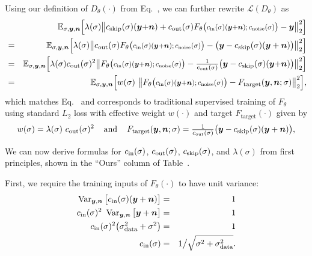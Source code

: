 Using our definition of $D_\theta(\cdot)$ from Eq.~, we can further rewrite $\mathcal{L}(D_\theta)$ as
\begin{eqnarray}
  && \mathbb{E}_{\sigma, \signal, \noise} \Big[ \lambda(\sigma) \big\lVert \cskip(\sigma) (\signal {+} \noise) + \cout(\sigma) F_\theta\big(\Fargs\big) - \signal \big\rVert^2_2 \Big] \label{eq:lossexpanded} \\
  &=& \mathbb{E}_{\sigma, \signal, \noise} \Big[ \lambda(\sigma) \big\lVert \cout(\sigma) F_\theta\big(\Fargs\big) - \big( \signal - \cskip(\sigma) (\signal + \noise) \big) \big\rVert^2_2 \Big] \\
  &=& \mathbb{E}_{\sigma, \signal, \noise} \Big[ \lambda(\sigma) \cout(\sigma)^2 \big\lVert F_\theta\big(\Fargs\big) - \tfrac{1}{\cout(\sigma)} \big( \signal - \cskip(\sigma) (\signal {+} \noise) \big) \big\rVert^2_2 \Big] \\
  &=& \mathbb{E}_{\sigma, \signal, \noise} \Big[ w(\sigma) ~\big\lVert F_\theta\big(\Fargs\big) - F_\text{target}(\signal, \noise; \sigma) \big\rVert^2_2 \Big]
  \text{,}
\end{eqnarray}
which matches Eq.~ and corresponds to traditional supervised training of $F_\theta$ using standard $L_2$ loss with effective weight $w(\cdot)$ and target $F_\text{target}(\cdot)$ given by
\begin{equation}
  w(\sigma) = \lambda(\sigma) ~c_\text{out}(\sigma)^2
  \hspace{4mm}\text{and}\hspace{4mm}
  F_\text{target}(\boldsymbol{y}, \boldsymbol{n}; \sigma) = \tfrac{1}{c_\text{out}(\sigma)} \big( \boldsymbol{y} - c_\text{skip}(\sigma) (\boldsymbol{y} + \boldsymbol{n}) \big)
  \text{,}
\end{equation}

We can now derive formulas for $c_\text{in}(\sigma)$, $c_\text{out}(\sigma)$, $c_\text{skip}(\sigma)$, and $\lambda(\sigma)$ from first principles, shown in the ``Ours'' column of Table~.

First, we require the training inputs of $F_\theta(\cdot)$ to have unit variance:
\begin{eqnarray}
  \operatorname{Var}_{\boldsymbol{y}, \boldsymbol{n}} \big[ c_\text{in}(\sigma) (\boldsymbol{y} + \boldsymbol{n}) \big] &=& 1 \\
  c_\text{in}(\sigma)^2 ~\operatorname{Var}_{\boldsymbol{y}, \boldsymbol{n}} \big[ \boldsymbol{y} + \boldsymbol{n} \big] &=& 1 \\
  c_\text{in}(\sigma)^2 \big( \sigma_\text{data}^2 + \sigma^2 \big) &=& 1 \\
  c_\text{in}(\sigma) &=& 1 \big/ \sqrt{\sigma^2 + \sigma_\text{data}^2}
  \text{.}
\end{eqnarray}


